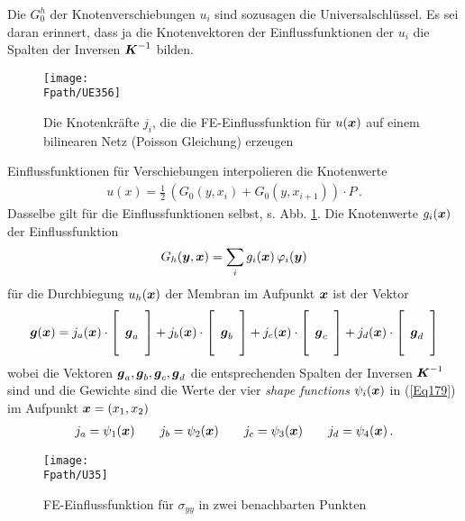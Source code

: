 Die $G_0^h$ der Knotenverschiebungen $u_i$ sind sozusagen die Universalschl\"{u}ssel. Es sei daran erinnert, dass ja die Knotenvektoren der Einflussfunktionen der $u_i$ die Spalten der Inversen $\vek K^{-1}$ bilden.

\begin{figure}
\centering
\if {} \sidecaption \fi
\texttt{[image: \\Fpath/UE356]}
\caption{Die Knotenkr\"{a}fte $j_i$, die die FE-Einflussfunktion f\"{u}r $u(\vek x)$ auf einem bilinearen Netz (Poisson Gleichung) erzeugen}
\label{UE356}%
\end{figure}%


Einflussfunktionen f\"{u}r Verschiebungen interpolieren die Knotenwerte
\begin{align}
u(x) = \frac{1}{2}\,(G_0(y,x_i) + G_0(y,x_{i+1})) \cdot P\,.
\end{align}
Dasselbe gilt f\"{u}r die Einflussfunktionen selbst, s. Abb. \ref{UE356}. Die Knotenwerte $g_i(\vek x)$ der Einflussfunktion
\begin{align}
G_h(\vek y,\vek x) = \sum_i g_i(\vek x)\,\Np_i(\vek y)
\end{align}
f\"{u}r die Durchbiegung $u_h(\vek x)$ der Membran im Aufpunkt $\vek x$ ist der Vektor
\begin{align}
\vek g(\vek x) = j_a(\vek x) \cdot \left [\barr{c} \phantom{.} \\  \vek g_a \\ \phantom{.} \earr \right ] + j_b(\vek x) \cdot \left [\barr{c} \phantom{.} \\  \vek g_b \\ \phantom{.} \earr \right ]+  j_c(\vek x) \cdot \left [\barr{c} \phantom{.} \\  \vek g_c \\ \phantom{.} \earr \right ] + j_d(\vek x) \cdot \left [\barr{c} \phantom{.} \\  \vek g_d \\ \phantom{.} \earr \right ]
\end{align}
wobei die Vektoren $\vek g_a, \vek g_b, \vek g_c, \vek g_d$ die entsprechenden Spalten der Inversen $\vek K^{-1}$ sind und die Gewichte sind die Werte der vier {\em shape functions\/} $\psi_i(\vek x)$ in (\ref{Eq179}) im Aufpunkt $\vek x = (x_1,x_2)$
\begin{align}
j_a = \psi_1(\vek x) \qquad j_b = \psi_2(\vek x)   \qquad j_c = \psi_3(\vek x) \qquad j_d = \psi_4(\vek x) \,.
\end{align}
\begin{figure}
\centering
\if {} \sidecaption \fi
\texttt{[image: \\Fpath/U35]}
\caption{FE-Einflussfunktion f\"{u}r $\sigma_{yy}$ in zwei benachbarten Punkten}
\label{U35}%
\end{figure}%

